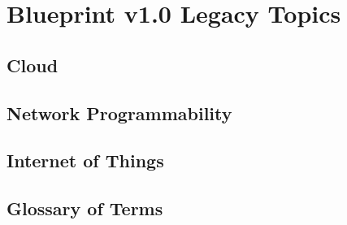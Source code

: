 \documentclass{article}
\begin{document}
\newpage
\section{Blueprint v1.0 Legacy Topics}
\renewcommand{\imgpath}{legacy/img/}
\subsection{Cloud}



\subsection{Network Programmability}

\subsection{Internet of Things}


\newpage
\subsection{Glossary of Terms}

\end{document}
